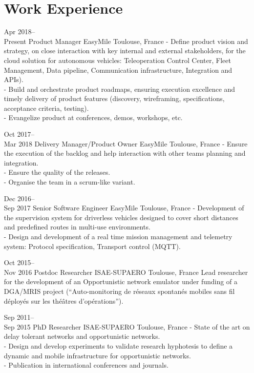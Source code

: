 \documentclass[10pt,a4paper,sans]{moderncv}
\begin{document}
\section{Work Experience}


\cventry
{Apr 2018--\\Present}
{Product Manager}
{EasyMile}
{Toulouse, France}
{}
{
- Define product vision and strategy, on close interaction with key internal and external stakeholders, for the cloud solution for autonomous vehicles: Teleoperation Control Center, Fleet Management, Data pipeline, Communication infrastructure, Integration and APIs).\\
- Build and orchestrate product roadmaps, ensuring execution excellence and timely delivery of product features (discovery, wireframing, specifications, acceptance criteria, testing).\\
- Evangelize product at conferences, demos, workshops, etc.\\
}

\cventry
{Oct 2017--\\Mar 2018}
{Delivery Manager/Product Owner}
{EasyMile}
{Toulouse, France}
{}
{
- Ensure the execution of the backlog and help interaction with other teams planning and integration.\\
- Ensure the quality of the releases.\\
- Organise the team in a scrum-like variant.\\
}

\cventry
{Dec 2016--\\Sep 2017}
{Senior Software Engineer}
{EasyMile}
{Toulouse, France}
{}
{
- Development of the supervision system for driverless vehicles designed to cover short distances and predefined routes in multi-use environments.\\
- Design and development of a real time mission management and telemetry system: Protocol specification, Transport control (MQTT).
}


\cventry
{Oct 2015--\\Nov 2016}
{Postdoc Researcher}
{ISAE-SUPAERO}
{Toulouse, France}
{}
{
Lead researcher for the development of an Opportunistic network emulator under funding of a DGA/MRIS project (``Auto-monitoring de réseaux spontanés mobiles sans fil déployés sur les théâtres d'opérations'').\\
}

\cventry
{Sep 2011--\\Sep 2015}
{PhD Researcher}
{ISAE-SUPAERO}
{Toulouse, France}
{}
{
- State of the art on delay tolerant networks and opportunistic networks.\\
- Design and develop experiments to validate research hyphotesis to define a dynamic and mobile infrastructure for opportunistic networks.\\
- Publication in international conferences and journals.\\
}
\end{document}
